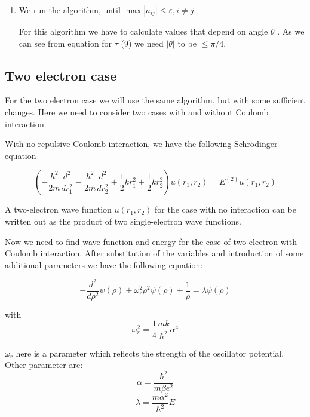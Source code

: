 \documentclass[10pt]{article}
\begin{document}
\begin{enumerate}
\item We run the algorithm, until $\max \left\vert a_{ij}\right\vert \leq
\varepsilon ,i\neq j.$


For this algorithm we have to calculate values that depend on angle $\theta $%
. As we can see from equation for $\tau$ (9) we need  $|\theta |$ to be $\leq
\pi /4$. 
\end{enumerate}
\subsection{Two electron case}
For the two electron case  we will use the same algorithm, but with some
sufficient changes. Here we need to consider two cases with and without
Coulomb interaction.

With no repulsive Coulomb interaction, we have the following Schr\"{o}dinger
equation

\begin{equation}
	\left( -\frac{\hbar ^{2}}{2m}\frac{d^{2}}{dr_{1}^{2}}-\frac{\hbar ^{2}}{2m}%
	\frac{d^{2}}{dr_{2}^{2}}+\frac{1}{2}kr_{1}^{2}+\frac{1}{2}kr_{2}^{2}\right)
	u(r_{1},r_{2})=E^{(2)}u(r_{1},r_{2})
\end{equation}


	A two-electron wave function $u(r_{1},r_{2})$ for the case with no
	interaction can be written out as the product of two single-electron wave
	functions.
	
	Now we need to find wave function and energy for the case of two electron
	with Coulomb interaction. After substitution of the variables and
	introduction of some additional parameters we have the following equation:
	
	\begin{equation}
		-\frac{d^{2}}{d\rho ^{2}}\psi (\rho )+\omega _{r}^{2}\rho ^{2}\psi (\rho )+%
		\frac{1}{\rho }=\lambda \psi (\rho )
	\end{equation}
	
	with 
	\begin{equation}
		\omega _{r}^{2}=\frac{1}{4}\frac{mk}{\hbar ^{2}}\alpha ^{4}
	\end{equation}
	
	$\omega _{r}$ here is a parameter which reflects the strength of the
	oscillator potential. Other parameter are:%
	\begin{equation}
		\alpha =\frac{\hbar ^{2}}{m\beta e^{2}}
	\end{equation}%
	\begin{equation}
		\lambda =\frac{m\alpha ^{2}}{\hbar ^{2}}E
	\end{equation}
	
\end{document}
